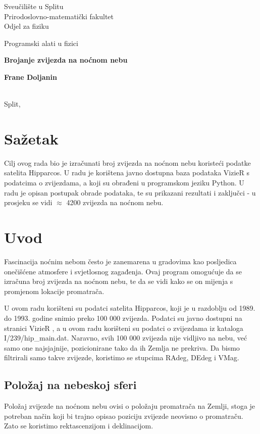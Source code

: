 \documentclass[a4paper,12pt]{article}
\begin{document}
\begin{center}
  Sveučilište u Splitu\\
  Prirodoslovno-matematički fakultet\\
  Odjel za fiziku

  \bigskip
  \bigskip

  \large{Programski alati u fizici}


  \bigskip
  \bigskip

  \textbf{{\Large{Brojanje zvijezda na noćnom nebu}}}
\end{center}
\begin{center}
  \textbf{Frane Doljanin}\\
  \
\end{center}
\begin{center}
  Split, 
\end{center}

\section*{Sažetak}
Cilj ovog rada bio je izračunati broj zvijezda na noćnom nebu koristeći podatke satelita Hipparcos. U radu je korištena javno dostupna baza podataka VizieR \cite{ct:VizieR} s podatcima o zvijezdama, a koji su obrađeni u programskom jeziku Python. U radu je opisan postupak obrade podataka, te su prikazani rezultati i zaključci - u prosjeku se vidi $\approx$ 4200 zvijezda na noćnom nebu.

\section{Uvod}
Fascinacija noćnim nebom često je zanemarena u gradovima kao posljedica onečišćene atmosfere i svjetlosnog zagađenja. Ovaj program omogućuje da se izračuna broj zvijezda na noćnom nebu, te da se vidi kako se on mijenja s promjenom lokacije promatrača.
\par
U ovom radu korišteni su podatci satelita Hipparcos, koji je u razdoblju od 1989. do 1993. godine snimio preko 100 000 zvijezda. Podatci su javno dostupni na stranici VizieR \cite{ct:VizieR}, a u ovom radu korišteni su podatci o zvijezdama iz kataloga I/239/hip\_main.dat.
Naravno, svih 100 000 zvijezda nije vidljivo na nebu, već samo one najsjajnije, pozicionirane tako da ih Zemlja ne prekriva. Da bismo filtrirali samo takve zvijezde, koristimo se stupcima RAdeg, DEdeg i VMag.

\subsection{Položaj na nebeskoj sferi}
Položaj zvijezde na noćnom nebu ovisi o položaju promatrača na Zemlji, stoga je potreban način koji bi trajno opisao poziciju zvijezde neovisno o promatraču. Zato se koristimo rektascenzijom i deklinacijom.
\end{document}
